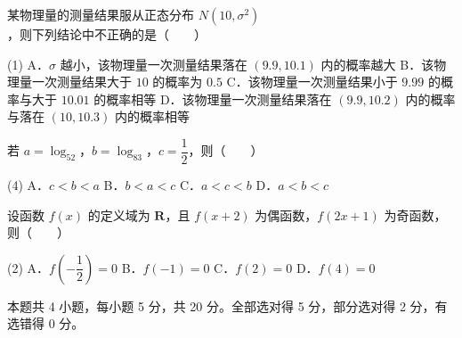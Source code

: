 \begin{question}
某物理量的测量结果服从正态分布 $N\left(10,\sigma^{2}\right)$，则下列结论中不正确的是（　　）

\begin{gkopts}(1)
\task A．$\sigma$ 越小，该物理量一次测量结果落在 $(9.9,10.1)$ 内的概率越大
\task B．该物理量一次测量结果大于 $10$ 的概率为 $0.5$
\task C．该物理量一次测量结果小于 $9.99$ 的概率与大于 $10.01$ 的概率相等
\task D．该物理量一次测量结果落在 $(9.9,10.2)$ 内的概率与落在 $(10,10.3)$ 内的概率相等
\end{gkopts}

\end{question}
\begin{question}
若 $a=\log_52$，$b=\log_83$，$c=\dfrac12$，则（　　）

\begin{gkopts}(4)
\task A．$c<b<a$
\task B．$b<a<c$
\task C．$a<c<b$
\task D．$a<b<c$
\end{gkopts}

\end{question}
\begin{question}
设函数 $f(x)$ 的定义域为 $\mathbf R$，且 $f(x+2)$ 为偶函数，$f(2x+1)$ 为奇函数，则（　　）

\begin{gkopts}(2)
\task A．$f\left(-\dfrac12\right)=0$
\task B．$f(-1)=0$
\task C．$f(2)=0$
\task D．$f(4)=0$
\end{gkopts}

\par\medskip

\end{question}

\begin{gktip}
本题共 4 小题，每小题 5 分，共 20 分。全部选对得 5 分，部分选对得 2 分，有选错得 0 分。
\end{gktip}

